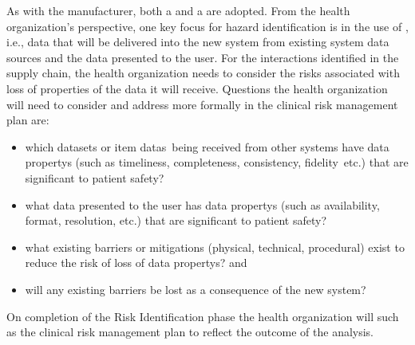 As with the manufacturer, both a  and a  are adopted. From the health organization's perspective, one key focus for \gls{hazard} identification is in the use of , i.e., data that will be delivered into the new system from existing system data sources and the data presented to the user. For the interactions identified in the supply chain, the health organization needs to consider the risks associated with loss of properties of the data it will receive. Questions the health organization will need to consider and address more formally in the clinical risk management plan are:
\clearpage%
\begin{itemize}
  \item which \glspl{dataset} or \cbstart\glspl{item data}\cbend\ being received from other systems have \glspl{data property} (such as \gls{timeliness}, \gls{completeness}, \gls{consistency}, \cbstart\gls{fidelity}\cbend\ etc.) that are significant to patient safety? 
  \item what data presented to the user has \glspl{data property} (such as \gls{availability}, format, \gls{resolution}, etc.) that are significant to patient safety?
  \item what existing barriers or \glspl{mitigation} (physical, technical, procedural) exist to reduce the risk of loss of \glspl{data property}? and
  \item will any existing barriers be lost as a consequence of the new system?
\end{itemize}

On completion of the Risk Identification phase the health organization will  such as the clinical risk management plan to reflect the outcome of the analysis.

